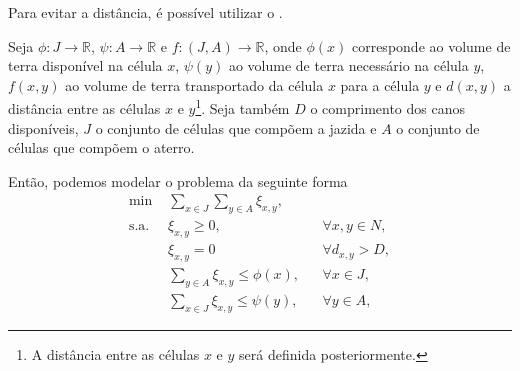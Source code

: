 Para evitar a distância, é possível utilizar o .

Seja $\phi : J \to \mathbb{R}$, $\psi: A \to \mathbb{R}$ e $f: (J, A) \to \mathbb{R}$,
onde $\phi(x)$ corresponde ao volume de terra disponível na célula $x$, $\psi(y)$
ao volume de terra necessário na célula $y$, $f(x,y)$ ao volume de terra
transportado da célula $x$ para a célula $y$ e $d(x, y)$ a distância entre as
células $x$ e $y$\footnote{A distância entre as células $x$ e $y$ será definida
posteriormente.}. Seja também $D$ o comprimento dos canos disponíveis, $J$ o
conjunto de células que compõem a jazida e $A$ o conjunto de células que compõem
o aterro.

Então, podemos modelar o problema da seguinte forma
\begin{subequations}
    \begin{align}
        \text{min } & \sum_{x \in J} \sum_{y \in A} \xi_{x,y},
        \label{eq:model_with_obs:obj_func} \\
        \text{s.a. } & \xi_{x,y} \geq 0, && \forall x, y \in N,
        \label{eq:model_with_obs:var} \\
        & \xi_{x,y} = 0 && \forall d_{x,y} > D,
        \label{eq:model_with_obs:max_dist} \\
        & \sum_{y \in A} \xi_{x,y} \leq \phi(x), && \forall x \in J,
        \label{eq:model_with_obs:max_jazida} \\
        & \sum_{x \in J} \xi_{x,y} \leq \psi(y), && \forall y \in A,
        \label{eq:model_with_obs:max_aterro}
    \end{align}
    \label{eq:model_with_obs}
\end{subequations}


